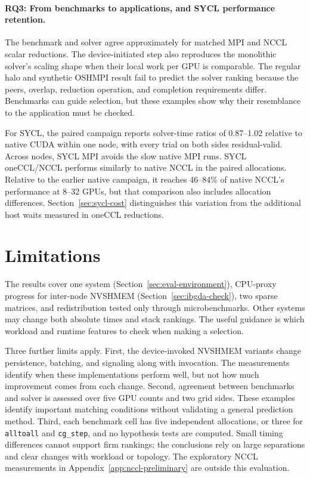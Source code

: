 \paragraph{RQ3: From benchmarks to applications, and SYCL performance retention.}
The benchmark and solver agree approximately for matched MPI and NCCL scalar reductions. The device-initiated step also reproduces the monolithic solver's scaling shape when their local work per GPU is comparable. The regular halo and synthetic OSHMPI result fail to predict the solver ranking because the peers, overlap, reduction operation, and completion requirements differ. Benchmarks can guide selection, but these examples show why their resemblance to the application must be checked.

For SYCL, the paired campaign reports solver-time ratios of 0.87--1.02 relative to native CUDA within one node, with every trial on both sides residual-valid. Across nodes, SYCL MPI avoids the slow native MPI runs. SYCL oneCCL/NCCL performs similarly to native NCCL in the paired allocations. Relative to the earlier native campaign, it reaches 46--84\% of native NCCL's performance at 8--32 GPUs, but that comparison also includes allocation differences. Section~\ref{sec:sycl-cost} distinguishes this variation from the additional host waits measured in oneCCL reductions.

\section{Limitations}\label{sec:limitations}

The results cover one system (Section~\ref{sec:eval-environment}), CPU-proxy progress for inter-node NVSHMEM (Section~\ref{sec:ibgda-check}), two sparse matrices, and redistribution tested only through microbenchmarks. Other systems may change both absolute times and stack rankings. The useful guidance is which workload and runtime features to check when making a selection.

Three further limits apply. First, the device-invoked NVSHMEM variants change persistence, batching, and signaling along with invocation. The measurements identify when these implementations perform well, but not how much improvement comes from each change. Second, agreement between benchmarks and solver is assessed over five GPU counts and two grid sides. These examples identify important matching conditions without validating a general prediction method. Third, each benchmark cell has five independent allocations, or three for \texttt{alltoall} and \texttt{cg\_step}, and no hypothesis tests are computed. Small timing differences cannot support firm rankings; the conclusions rely on large separations and clear changes with workload or topology. The exploratory NCCL measurements in Appendix~\ref{app:nccl-preliminary} are outside this evaluation.

